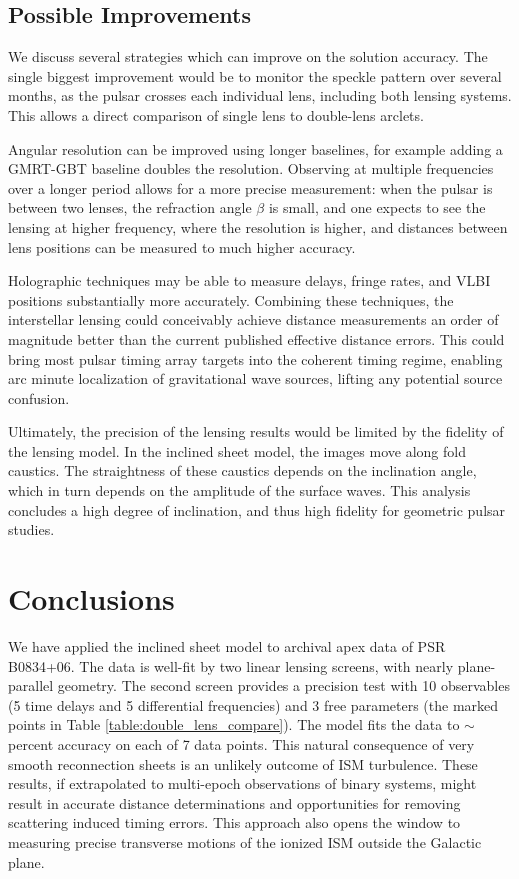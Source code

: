 \documentclass[useAMS,usenatbib]{mn2e}
\begin{document}
\subsection{Possible Improvements}

We discuss several strategies which can improve on the solution
accuracy.  The single biggest improvement would be to monitor the speckle pattern over
several months, as the pulsar crosses each individual lens,
including both lensing systems.  This allows a direct comparison of
single lens to double-lens arclets.

Angular resolution can be improved using longer baselines, for example
adding a GMRT-GBT baseline doubles the resolution.  Observing at
multiple frequencies over a longer period allows for a more precise
measurement: when the pulsar is between two lenses, the refraction
angle $\beta$ is small, and one expects to see the lensing at higher
frequency, where the resolution is higher, and distances between
lens positions can be measured to much higher accuracy.

Holographic techniques \citep{2008MNRAS.388.1214W,2014MNRAS.440L..36P}
may be able to measure delays, fringe rates, and VLBI positions
substantially more accurately.  Combining these techniques, the
interstellar lensing could conceivably achieve distance measurements
an order of magnitude better than the current published effective
distance errors.  This could bring most pulsar timing array targets
into the coherent timing regime, enabling arc minute localization of
gravitational wave sources, lifting any potential source confusion.

Ultimately, the precision of the lensing results would be limited by
the fidelity of the lensing model.  In the inclined sheet model, the
images move along fold caustics.  The straightness of these caustics
depends on the inclination angle, which in turn depends on the
amplitude of the surface waves.  This analysis concludes a high degree
of inclination, and thus high fidelity for geometric pulsar studies.

\section{Conclusions}

We have applied the inclined sheet model \citep{2014MNRAS.442.3338P} 
to archival apex data of PSR B0834+06.  The data is well-fit by two
linear lensing screens, with nearly plane-parallel geometry.  The
second screen provides a precision test with 10 observables (5 time delays and 5 differential frequencies) and 3 free
parameters (the marked points in Table \ref{table:double_lens_compare}).  The model fits the data to $\sim$ percent accuracy
on each of 7 data points.  
This natural consequence of very smooth
reconnection sheets is an unlikely outcome of ISM turbulence.  These
results, if extrapolated to multi-epoch observations of binary
systems, might result in accurate distance determinations and
opportunities for removing scattering induced timing errors.  This
approach also opens the window to measuring precise transverse motions
of the ionized ISM outside the Galactic plane.
\end{document}
